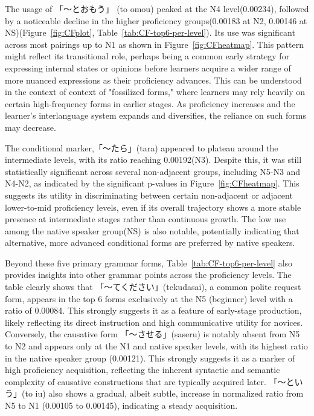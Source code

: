 The usage of 「〜とおもう」 (to omou) peaked at the N4 level(0.00234), followed by a noticeable decline in the higher
proficiency
groups(0.00183 at N2, 0.00146 at NS)(Figure~\ref{fig:CFplot}, Table~\ref{tab:CF-top6-per-level}). Its
use was
significant across most pairings up to N1 as shown in Figure~\ref{fig:CFheatmap}. This pattern might reflect its
transitional
role, perhaps being a common early strategy for expressing
internal states or
opinions before learners acquire a wider range of more nuanced expressions as their proficiency advances. This can 
be understood in the context of \citet{selinker1972} context of "fossilized forms," where learners may rely heavily
on certain high-frequency forms in earlier stages. As proficiency increases and the learner's interlanguage system
expands and diversifies, the reliance on such forms may decrease.

The conditional marker,「〜たら」(tara) appeared to plateau  around the intermediate levels, with its ratio reaching
0.00192(N3). Despite this, it was still statistically significant across several
non-adjacent
groups, including N5-N3 and
N4-N2,
as indicated by the significant p-values in Figure~\ref{fig:CFheatmap}. This suggests its utility in discriminating
between certain non-adjacent or adjacent lower-to-mid proficiency levels, even if its overall trajectory shows a
more stable presence at intermediate stages rather than continuous growth. The low use among the native speaker
group(NS) is also notable, potentially indicating that alternative, more advanced conditional forms are preferred by
native speakers.

Beyond these five primary grammar forms, Table~\ref{tab:CF-top6-per-level} also provides insights into other grammar
points across the proficiency levels. The table clearly shows that 「〜てください」(tekudasai), a common polite request
form, appears in the top 6 forms exclusively at the N5 (beginner) level with a ratio of 0.00084. This strongly
suggests it as a feature of early-stage production, likely reflecting its direct instruction and high communicative
utility for novices. Conversely, the causative form 「〜させる」(saseru) is notably absent from N5 to N2 and appears only
at the N1 and native speaker levels, with its highest ratio in the native speaker group (0.00121). This strongly
suggests it as a marker of high proficiency acquisition, reflecting the inherent syntactic and semantic complexity
of causative constructions that are typically acquired later. 「〜という」(to iu) also shows a gradual, albeit subtle,
increase in normalized ratio from N5 to N1 (0.00105 to 0.00145), indicating a steady acquisition.

